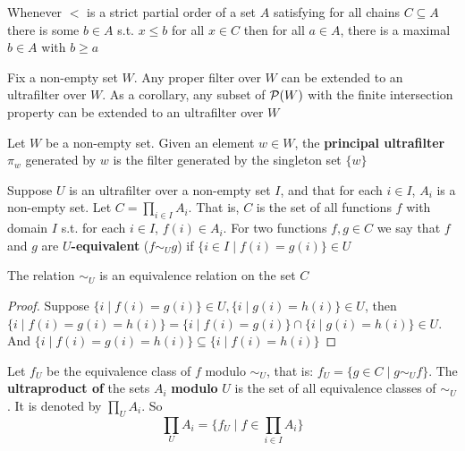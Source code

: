 \documentclass[11pt]{article}
\begin{document}
\begin{lemma}
Whenever \(<\) is a strict partial order of a set \(A\) satisfying for all
chains \(C\subseteq A\) there is some \(b\in A\) s.t. \(x\le b\) for all
\(x\in C\) then for all \(a\in A\), there is a maximal \(b\in A\) with
\(b\ge a\)
\end{lemma}

\begin{theorem}
Fix a non-empty set \(W\). Any proper filter over \(W\) can be extended to
an ultrafilter over \(W\). As a corollary, any subset of \(\mathcal{P}(W)\) with
the finite intersection property can be extended to an ultrafilter over \(W\)
\end{theorem}

\begin{definition}[]
Let \(W\) be a non-empty set. Given an element \(w\in  W\), the \textbf{principal
ultrafilter} \(\pi_w\) generated by \(w\) is the filter generated by the
singleton set \(\{w\}\)
\end{definition}

Suppose \(U\) is an ultrafilter over a non-empty set \(I\), and that for
each \(i\in I\), \(A_i\) is a non-empty set. Let \(C=\prod_{i\in I}A_i\).
That is, \(C\) is the set of all functions \(f\) with domain \(I\) s.t. for
each \(i\in I\), \(f(i)\in A_i\). For two functions \(f,g\in C\) we say that
\(f\) and \(g\) are \textbf{\(U\)-equivalent} (\(f\sim_U g\)) if \(\{i\in I\mid
    f(i)=g(i)\}\in U\)

\begin{proposition}[]
The relation \(\sim_U\) is an equivalence relation on the set \(C\)
\end{proposition}

\begin{proof}
Suppose \(\{i\mid f(i)=g(i)\}\in U,\{i\mid g(i)=h(i)\}\in U\), then
\(\{i\mid f(i)=g(i)=h(i)\}=\{i\mid f(i)=g(i)\}\cap\{i\mid g(i)=h(i)\}\in
    U\). And
\(\{i\mid f(i)=g(i)=h(i)\}\subseteq\{i\mid f(i)=h(i)\}\)
\end{proof}

\begin{definition}[]
Let \(f_U\) be the equivalence class of \(f\) modulo \(\sim_U\), that is:
\(f_U=\{g\in C\mid g\sim_U f\}\). The \textbf{ultraproduct of} the sets \(A_i\)
\textbf{modulo} \(U\) is the set of all equivalence classes of \(\sim_U\). It is
denoted by \(\prod_UA_i\). So
\begin{equation*}
\prod_UA_i=\{f_U\mid f\in\prod_{i\in I}A_i\}
\end{equation*}
\end{definition}
\end{document}
